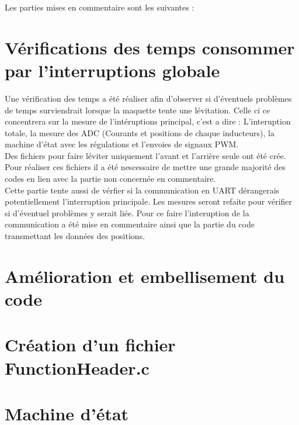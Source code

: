 Les parties mises en commentaire sont les suivantes :


\section{Vérifications des temps consommer par l'interruptions globale}
Une vérification des temps a été réaliser afin d'observer si d'éventuels problèmes de temps surviendrait lorsque la maquette tente une lévitation. Celle ci ce concentrera sur la mesure de l'intéruptions principal, c'est a dire : L'interuption totale, la mesure des ADC (Courants et positions de chaque inducteurs), la machine d'état avec les régulations et l'envoies de signaux PWM.\\

Des fichiers pour faire léviter uniquement l'avant et l'arrière seule ont été crée. Pour réaliser ces fichiers il a été nescessaire de mettre une grande majorité des codes en lien avec la partie non concernée en commentaire.\\

Cette partie tente aussi de vérfier si la communication en UART dérangerais potentiellement l'interruption principale. Les mesures seront refaite pour vérifier si d'éventuel problèmes y serait liée. Pour ce faire l'interuption de la communication a été mise en commentaire ainsi que la partie du code transmettant les données des positions.\\


\section{Amélioration et embellisement du code}

\section{Création d'un fichier FunctionHeader.c}

\section{Machine d'état}
